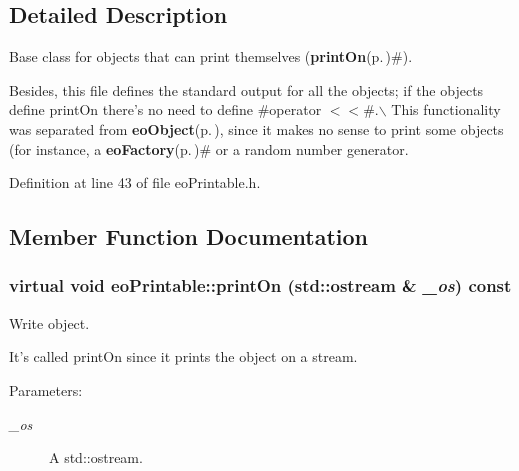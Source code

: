 \subsection{Detailed Description}
Base class for objects that can print themselves ({\bf print\-On}{\rm (p.\,\pageref{classeo_printable_a1})}\#). 

Besides, this file defines the standard output for all the objects; if the objects define print\-On there's no need to define \#operator $<$$<$\#.$\backslash$ This functionality was separated from {\bf eo\-Object}{\rm (p.\,\pageref{classeo_object})}, since it makes no sense to print some objects (for instance, a {\bf eo\-Factory}{\rm (p.\,\pageref{classeo_factory})}\# or a random number generator. 



Definition at line 43 of file eo\-Printable.h.

\subsection{Member Function Documentation}
\subsubsection{\setlength{\rightskip}{0pt plus 5cm}virtual void eo\-Printable::print\-On (std::ostream \& {\em \_\-os}) const\hspace{0.3cm}{\tt  [pure virtual]}}\label{classeo_printable_a1}


Write object. 

It's called print\-On since it prints the object on a stream. \begin{Desc}
\item[Parameters:]
\begin{description}
\item[{\em \_\-os}]A std::ostream. \end{description}
\end{Desc}


